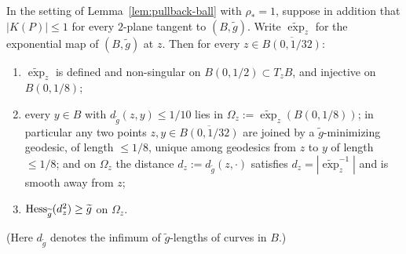 \begin{lemma}
\label{lem:pullback-unique-minimizers}


In the setting of Lemma~\ref{lem:pullback-ball} with $\rho_*=1$,
suppose in addition that $|K(P)|\le1$ for every $2$-plane tangent
to $(B,\tilde g)$. Write $\widetilde\exp_z$ for the exponential
map of $(B,\tilde g)$ at $z$. Then for every $z\in
\overline{B(0,1/32)}$:
\begin{enumerate}
\item $\widetilde\exp_z$ is defined and non-singular on
$B(0,1/2)\subset T_z B$, and injective on $B(0,1/8)$;
\item every $y\in B$ with $d_{\tilde g}(z,y)\le1/10$ lies in
$\Omega_z:=\widetilde\exp_z(B(0,1/8))$; in particular any two
points $z,y\in\overline{B(0,1/32)}$ are joined by a
$\tilde g$-minimizing geodesic, of length $\le1/8$, unique among
geodesics from $z$ to $y$ of length $\le 1/8$; and on
$\Omega_z$ the distance
$d_z:=d_{\tilde g}(z,\cdot)$ satisfies
$d_z=|\widetilde\exp_z^{-1}|$ and is smooth away from $z$;
\item $\operatorname{Hess}_{\widetilde g}(d_z^2)\ge\widetilde g$ on $\Omega_z$.
\end{enumerate}
(Here $d_{\tilde g}$ denotes the infimum of $\tilde g$-lengths of
curves in $B$.)
\end{lemma}

